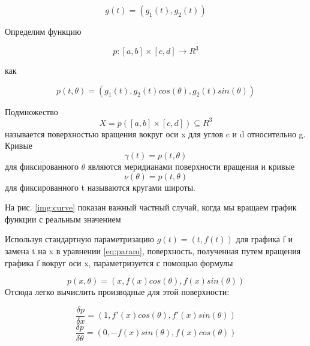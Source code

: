 \begin{equation}
    g(t) = (g_1(t), g_2(t))
\end{equation}

Определим функцию

\begin{equation}
    p: [a, b] \times [c, d] \longrightarrow R^3
\end{equation}

как

\begin{equation}
    p(t, \theta) = (g_1(t), g_2(t)cos(\theta), g_2(t)sin(\theta))\label{eq:param}
\end{equation}

Подмножество
\begin{equation}
    X = p([a, b] \times [c, d]) \subseteq R^3
\end{equation}
называется поверхностью вращения вокруг оси x для углов c и d относительно g.\newline
Кривые
\begin{equation}
    \gamma(t) = p(t, \theta)
\end{equation}
для фиксированного \(\theta\) являются меридианами поверхности вращения и кривые
\begin{equation}
    \nu(\theta) = p(t, \theta)
\end{equation}
для фиксированного t называются кругами широты.\newline

На рис. \ref{img:curve} показан важный частный случай, когда мы вращаем график функции с реальным значением

Используя стандартную параметризацию \(g(t) = (t,f(t))\) для
графика f и замена t на x в уравнении \ref{eq:param}, поверхность, полученная путем вращения графика f вокруг оси x,
параметризуется с помощью формулы

\begin{equation}
    p(x, \theta) = (x, f(x)cos(\theta), f(x)sin(\theta))
\end{equation}
Отсюда легко вычислить производные для этой поверхности:

\begin{equation}
    \frac{\delta p}{\delta x} = (1, f'(x)cos(\theta), f'(x)sin(\theta))
\end{equation}
\begin{equation}
    \frac{\delta p}{\delta \theta} = (0, -f(x)sin(\theta), f(x)cos(\theta))
\end{equation}

